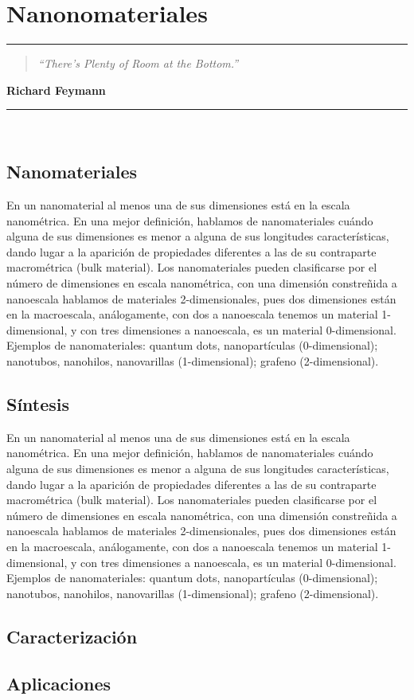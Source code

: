 \chapter{\label{cap:1} Nanonomateriales}

\noindent
\rule{\linewidth}{1 pt}
\begin{flushright}
\begin{quotation}
\small{
\textit{``There’s Plenty of Room at the Bottom.''}}
\end{quotation}
\bf{Richard Feymann}
\end{flushright}
\noindent
\rule{\linewidth}{1 pt}\\
\vspace{1cm}


\section{Nanomateriales}
En un nanomaterial al menos una de sus dimensiones está en la escala nanométrica. En una mejor definición, hablamos de nanomateriales cuándo alguna de sus dimensiones es menor a alguna de sus longitudes características, dando lugar a la aparición de propiedades diferentes a las de su contraparte macrométrica (bulk material). Los nanomateriales pueden clasificarse por el número de dimensiones en escala nanométrica, con una dimensión constreñida a nanoescala hablamos de materiales 2-dimensionales, pues dos dimensiones están en la macroescala, análogamente, con dos a nanoescala tenemos un material 1-dimensional, y con tres dimensiones a nanoescala, es un material 0-dimensional. Ejemplos de nanomateriales: quantum dots,  nanopartículas (0-dimensional); nanotubos, nanohilos, nanovarillas (1-dimensional); grafeno (2-dimensional).

\section{Síntesis}
En un nanomaterial al menos una de sus dimensiones está en la escala nanométrica. En una mejor definición, hablamos de nanomateriales cuándo alguna de sus dimensiones es menor a alguna de sus longitudes características, dando lugar a la aparición de propiedades diferentes a las de su contraparte macrométrica (bulk material). Los nanomateriales pueden clasificarse por el número de dimensiones en escala nanométrica, con una dimensión constreñida a nanoescala hablamos de materiales 2-dimensionales, pues dos dimensiones están en la macroescala, análogamente, con dos a nanoescala tenemos un material 1-dimensional, y con tres dimensiones a nanoescala, es un material 0-dimensional. Ejemplos de nanomateriales: quantum dots,  nanopartículas (0-dimensional); nanotubos, nanohilos, nanovarillas (1-dimensional); grafeno (2-dimensional).

\section{Caracterización}

\section{Aplicaciones}
